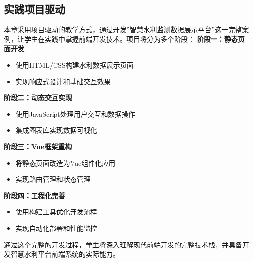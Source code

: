 \subsection{实践项目驱动}\label{ux5b9eux8df5ux9879ux76eeux9a71ux52a8}
本章采用项目驱动的教学方式，通过开发''智慧水利监测数据展示平台''这一完整案例，让学生在实践中掌握前端开发技术。项目将分为多个阶段： \textbf{阶段一：静态页面开发} \begin{itemize} \tightlist \item
使用HTML/CSS构建水利数据展示页面 \item 实现响应式设计和基础交互效果 \end{itemize} \textbf{阶段二：动态交互实现} \begin{itemize} \tightlist \item
使用JavaScript处理用户交互和数据操作 \item 集成图表库实现数据可视化 \end{itemize} \textbf{阶段三：Vue框架重构} \begin{itemize} \tightlist \item
将静态页面改造为Vue组件化应用 \item 实现路由管理和状态管理 \end{itemize} \textbf{阶段四：工程化完善} \begin{itemize} \tightlist \item 使用构建工具优化开发流程 \item
实现自动化部署和性能监控 \end{itemize} 通过这个完整的开发过程，学生将深入理解现代前端开发的完整技术栈，并具备开发智慧水利平台前端系统的实际能力。
